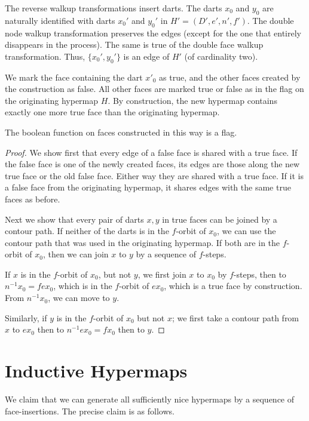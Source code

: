 The reverse walkup transformations insert darts.  The darts $x_0$ and
$y_0$ are naturally identified with darts $x_0'$ and $y_0'$ in $H'=(D',e',n',f')$.
The double node walkup transformation preserves the edges (except for
the one that entirely disappears in the process).  The same is true of the
double face walkup transformation.  Thus, $\{x_0',y_0'\}$ is an edge of
$H'$ (of cardinality two).

We mark the face containing the dart $x'_0$ as true, and the other
faces created by the construction as false.   All other faces are
marked true or false as in the flag on the originating hypermap $H$.  By
construction, the new hypermap contains exactly one more true face
than the originating hypermap.

\begin{lemma} The boolean function on faces constructed in this way is a
flag.
\end{lemma}

\begin{proof}  We show first that every edge of a false face is shared
with a true face.  If the false face is one of the newly created
faces, its edges are those along the new true face or the old false
face. Either way they are shared with a true face.   If it is a
false face from the originating hypermap, it shares edges with the
same true faces as before.

Next we show that every pair of darts $x,y$ in true faces can be
joined by a contour path.  If neither of the darts is in the
$f$-orbit of $x_0$, we can use the contour path that was used in the
originating hypermap.  If both are in the $f$-orbit of $x_0$, then
we can join $x$ to $y$ by a sequence of $f$-steps.

If $x$ is in the $f$-orbit of $x_0$, but not $y$, we first join $x$
to $x_0$ by $f$-steps, then to $n^{-1} x_0 = f e x_0$, which is in
the $f$-orbit of $e x_0$, which is a true face by construction.
From $n^{-1} x_0$, we can move to $y$.

Similarly, if $y$ is in the $f$-orbit of $x_0$ but not $x$; we first
take a contour path from $x$ to $e x_0$ then to $n^{-1} e x_0 = f
x_0$ then to $y$.
\end{proof}

\section{Inductive Hypermaps}

We claim that we can generate all sufficiently nice hypermaps by a
sequence of face-insertions.  The precise claim is as follows.

